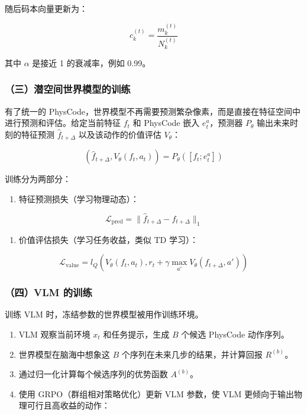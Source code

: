 随后码本向量更新为：

\[
c_k^{(t)}
= \frac{m_k^{(t)}}{N_k^{(t)}}
\]

其中 \(\alpha\) 是接近 1 的衰减率，例如 0.99。

\hypertarget{ux4e09ux6f5cux7a7aux95f4ux4e16ux754cux6a21ux578bux7684ux8badux7ec3}{%
\subsubsection{（三）潜空间世界模型的训练}\label{ux4e09ux6f5cux7a7aux95f4ux4e16ux754cux6a21ux578bux7684ux8badux7ec3}}

有了统一的 PhysCode，世界模型不再需要预测繁杂像素，而是直接在特征空间中进行预测和评估。给定当前特征 \(f_t\) 和 PhysCode 嵌入 \(e_t^a\)，预测器 \(P_\theta\) 输出未来时刻的特征预测 \(\hat{f}_{t+\Delta}\) 以及该动作的价值评估 \(V_\theta\)：

\[
(\hat{f}_{t+\Delta}, V_\theta(f_t, a_t))
= P_\theta([f_t; e_t^a])
\]

训练分为两部分：

\begin{enumerate}
\def\labelenumi{\arabic{enumi}.}
\tightlist
\item
  特征预测损失（学习物理动态）：
\end{enumerate}

\[
\mathcal{L}_{\mathrm{pred}}
= \lVert \hat{f}_{t+\Delta} - f_{t+\Delta} \rVert_1
\]

\begin{enumerate}
\def\labelenumi{\arabic{enumi}.}
\setcounter{enumi}{1}
\tightlist
\item
  价值评估损失（学习任务收益，类似 TD 学习）：
\end{enumerate}

\[
\mathcal{L}_{\mathrm{value}}
= l_Q\left(
V_\theta(f_t, a_t),
r_t + \gamma \max_{a'} V_\theta(f_{t+\Delta}, a')
\right)
\]

\hypertarget{ux56dbvlm-ux7684ux8badux7ec3}{%
\subsubsection{（四）VLM 的训练}\label{ux56dbvlm-ux7684ux8badux7ec3}}

训练 VLM 时，冻结参数的世界模型被用作训练环境。

\begin{enumerate}
\def\labelenumi{\arabic{enumi}.}
\tightlist
\item
  VLM 观察当前环境 \(x_t\) 和任务提示，生成 \(B\) 个候选 PhysCode 动作序列。
\item
  世界模型在脑海中想象这 \(B\) 个序列在未来几步的结果，并计算回报 \(R^{(b)}\)。
\item
  通过归一化计算每个候选序列的优势函数 \(A^{(b)}\)。
\item
  使用 GRPO（群组相对策略优化）更新 VLM 参数，使 VLM 更倾向于输出物理可行且高收益的动作：
\end{enumerate}

